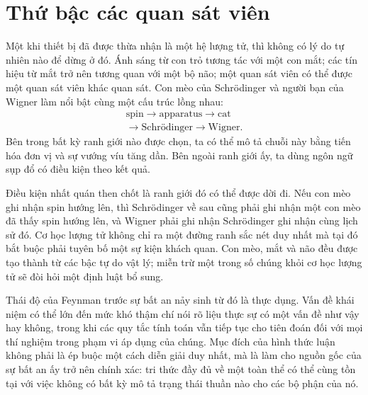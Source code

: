\begin{classroomqa}
\end{classroomqa}

\section{Thứ bậc các quan sát viên}

Một khi thiết bị đã được thừa nhận là một hệ lượng tử, thì không có lý do tự nhiên nào để dừng ở đó. Ánh sáng từ con trỏ tương tác với một con mắt; các tín hiệu từ mắt trở nên tương quan với một bộ não; một quan sát viên có thể được một quan sát viên khác quan sát. Con mèo của Schr\"odinger và người bạn của Wigner làm nổi bật cùng một cấu trúc lồng nhau:
\begin{equation}
\begin{gathered}
\text{spin}
\longrightarrow
\text{apparatus}
\longrightarrow
\text{cat}\\
\longrightarrow
\text{Schr\"odinger}
\longrightarrow
\text{Wigner}.
\end{gathered}
\label{eq:l7-observer-chain}
\end{equation}
Bên trong bất kỳ ranh giới nào được chọn, ta có thể mô tả chuỗi này bằng tiến hóa đơn vị và sự vướng víu tăng dần. Bên ngoài ranh giới ấy, ta dùng ngôn ngữ sụp đổ có điều kiện theo kết quả.

Điều kiện nhất quán then chốt là ranh giới đó có thể được dời đi. Nếu con mèo ghi nhận spin hướng lên, thì Schr\"odinger về sau cũng phải ghi nhận một con mèo đã thấy spin hướng lên, và Wigner phải ghi nhận Schr\"odinger ghi nhận cùng lịch sử đó. Cơ học lượng tử không chỉ ra một đường ranh sắc nét duy nhất mà tại đó bắt buộc phải tuyên bố một sự kiện khách quan. Con mèo, mắt và não đều được tạo thành từ các bậc tự do vật lý; miễn trừ một trong số chúng khỏi cơ học lượng tử sẽ đòi hỏi một định luật bổ sung.

Thái độ của Feynman trước sự bất an nảy sinh từ đó là thực dụng. Vấn đề khái niệm có thể lớn đến mức khó thậm chí nói rõ liệu thực sự có một vấn đề như vậy hay không, trong khi các quy tắc tính toán vẫn tiếp tục cho tiên đoán đối với mọi thí nghiệm trong phạm vi áp dụng của chúng. Mục đích của hình thức luận không phải là ép buộc một cách diễn giải duy nhất, mà là làm cho nguồn gốc của sự bất an ấy trở nên chính xác: tri thức đầy đủ về một toàn thể có thể cùng tồn tại với việc không có bất kỳ mô tả trạng thái thuần nào cho các bộ phận của nó.


